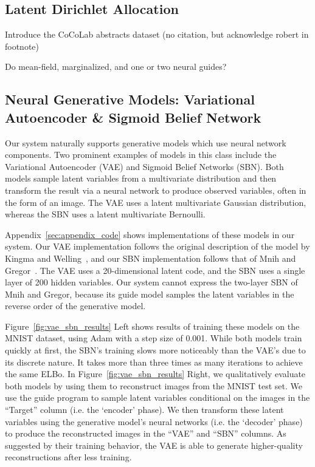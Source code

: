 \subsection{Latent Dirichlet Allocation}
\label{sec:results_lda}

Introduce the CoCoLab abstracts dataset (no citation, but acknowledge robert in footnote)

Do mean-field, marginalized, and one or two neural guides?

\subsection{Neural Generative Models: Variational Autoencoder \& Sigmoid Belief Network}
\label{sec:results_vae}

Our system naturally supports generative models which use neural network components. Two prominent examples of models in this class include the Variational Autoencoder (VAE) and Sigmoid Belief Networks (SBN). Both models sample latent variables from a multivariate distribution and then transform the result via a neural network to produce observed variables, often in the form of an image. The VAE uses a latent multivariate Gaussian distribution, whereas the SBN uses a latent multivariate Bernoulli.

Appendix~\ref{sec:appendix_code} shows implementations of these models in our system. Our VAE implementation follows the original description of the model by Kingma and Welling~\cite{AEVB}, and our SBN implementation follows that of Mnih and Gregor~\cite{NVIL}.
The VAE uses a 20-dimensional latent code, and the SBN uses a single layer of 200 hidden variables. Our system cannot express the two-layer SBN of Mnih and Gregor, because its guide model samples the latent variables in the reverse order of the generative model.

Figure~\ref{fig:vae_sbn_results} Left shows results of training these models on the MNIST dataset, using Adam with a step size of 0.001.
While both models train quickly at first, the SBN's training slows more noticeably than the VAE's due to its discrete nature. It takes more than three times as many iterations to achieve the same ELBo.
In Figure~\ref{fig:vae_sbn_results} Right, we qualitatively evaluate both models by using them to reconstruct images from the MNIST test set. We use the guide program to sample latent variables conditional on the images in the ``Target'' column (i.e. the `encoder' phase). We then transform these latent variables using the generative model's neural networks (i.e. the `decoder' phase) to produce the reconstructed images in the ``VAE'' and ``SBN'' columns.
As suggested by their training behavior, the VAE is able to generate higher-quality reconstructions after less training.

